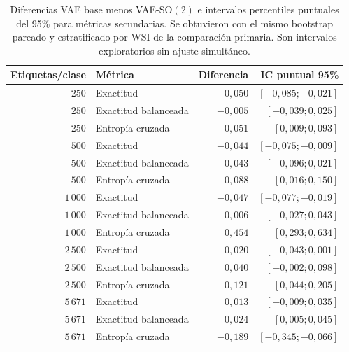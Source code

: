 \begin{table}[htbp]
    \centering
    \caption[Diferencias e intervalos exploratorios de métricas secundarias.]{Diferencias VAE base menos VAE-\(\mathrm{SO}(2)\) e intervalos percentiles puntuales del 95\% para métricas secundarias. Se obtuvieron con el mismo bootstrap pareado y estratificado por WSI de la comparación primaria. Son intervalos exploratorios sin ajuste simultáneo.}
    \label{tab:tejido-secundarias-intervalos}
    \small
    \begin{tabular}{@{}rlrr@{}}
        \toprule
        Etiquetas/clase & Métrica & Diferencia & IC puntual 95\% \\
        \midrule
        \(250\) & Exactitud & \(-0,050\) & \([-0,085;-0,021]\) \\
        \(250\) & Exactitud balanceada & \(-0,005\) & \([-0,039;0,025]\) \\
        \(250\) & Entropía cruzada & \(0,051\) & \([0,009;0,093]\) \\
        \(500\) & Exactitud & \(-0,044\) & \([-0,075;-0,009]\) \\
        \(500\) & Exactitud balanceada & \(-0,043\) & \([-0,096;0,021]\) \\
        \(500\) & Entropía cruzada & \(0,088\) & \([0,016;0,150]\) \\
        \(1\,000\) & Exactitud & \(-0,047\) & \([-0,077;-0,019]\) \\
        \(1\,000\) & Exactitud balanceada & \(0,006\) & \([-0,027;0,043]\) \\
        \(1\,000\) & Entropía cruzada & \(0,454\) & \([0,293;0,634]\) \\
        \(2\,500\) & Exactitud & \(-0,020\) & \([-0,043;0,001]\) \\
        \(2\,500\) & Exactitud balanceada & \(0,040\) & \([-0,002;0,098]\) \\
        \(2\,500\) & Entropía cruzada & \(0,121\) & \([0,044;0,205]\) \\
        \(5\,671\) & Exactitud & \(0,013\) & \([-0,009;0,035]\) \\
        \(5\,671\) & Exactitud balanceada & \(0,024\) & \([0,005;0,045]\) \\
        \(5\,671\) & Entropía cruzada & \(-0,189\) & \([-0,345;-0,066]\) \\
        \bottomrule
    \end{tabular}
\end{table}
